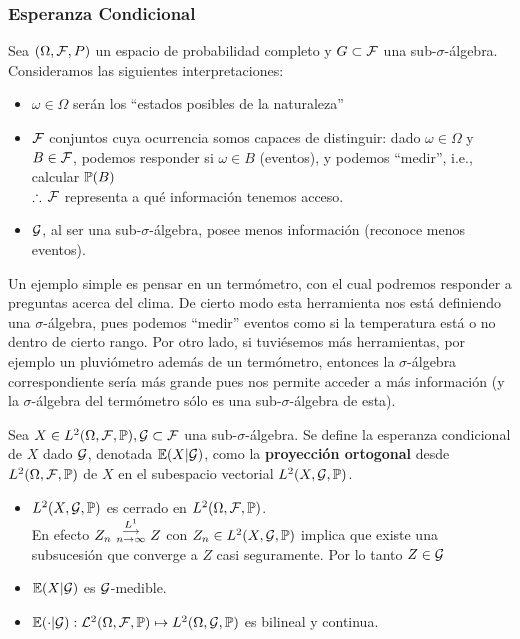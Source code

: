 \subsubsection{Esperanza Condicional} %
Sea $(\Omega,\F,P)$ un espacio de probabilidad completo y $G\subset \F$ una sub-$\sigma$-álgebra. Consideramos las siguientes interpretaciones:
\begin{itemize}
    \item $\omega\in\Omega$ serán los ``estados posibles de la naturaleza''
    \item $\F$ conjuntos cuya ocurrencia somos capaces de distinguir: dado $\omega \in\Omega$ y $B\in\F$, podemos responder si $\omega\in B$ (eventos), y podemos ``medir'', i.e., calcular $\P(B)$ \\
    $\therefore\,\F$ representa a qué información tenemos acceso.
    \item $\G$, al ser una sub-$\sigma$-álgebra, posee menos información (reconoce menos eventos).
\end{itemize}
Un ejemplo simple es pensar en un termómetro, con el cual podremos responder a preguntas acerca del clima. De cierto modo esta herramienta nos está definiendo una $\sigma$-álgebra, pues podemos ``medir'' eventos como si la temperatura está o no dentro de cierto rango. Por otro lado, si tuviésemos más herramientas, por ejemplo un pluviómetro además de un termómetro, entonces la $\sigma$-álgebra correspondiente sería más grande pues nos permite acceder a más información (y la $\sigma$-álgebra del termómetro sólo es una sub-$\sigma$-álgebra  de esta).
\begin{definition}
Sea $X\in L^2\edp, \G\subset\F$ una sub-$\sigma$-álgebra. Se define la esperanza condicional de $X$ dado $\G$, denotada $\E(X|\G)$, como la \textbf{proyección ortogonal} desde $L^2\edp$ de $X$ en el subespacio vectorial $L^2(X,\G,\P)$.
\end{definition}
\begin{remark}
\beforeitemize
\begin{itemize}
    \item $L^2(X,\G,\P)$ es cerrado en $L^2\edp$.
    \\ En efecto $Z_n\convldos Z$ con $Z_n\in L^2(X,\G,\P)$ implica que existe una subsucesión que converge a $Z$ casi seguramente. Por lo tanto $Z\in\G$
    \item $\E(X|\G)$ es $\G$-medible.
    \item $\E(\cdot|\G):\L^2\edp\mapsto L^2(\Omega,\G,\P)$ es bilineal y continua.
\end{itemize}

\end{remark}
